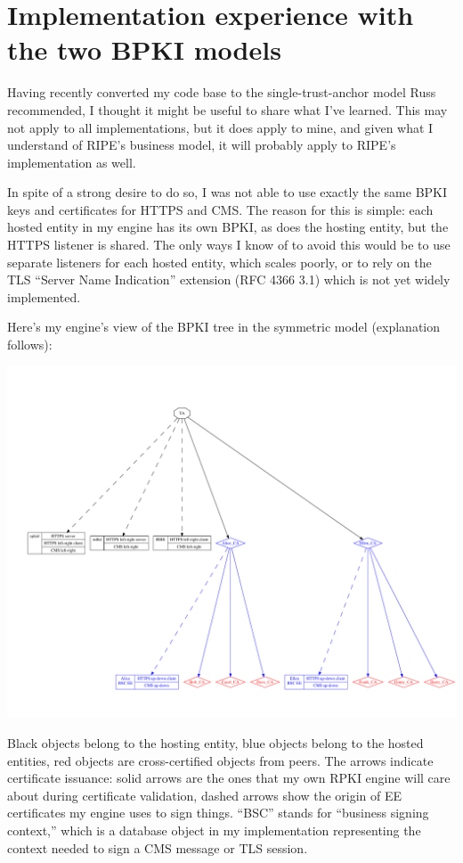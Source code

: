 \documentclass[11pt]{article}
\begin{document}
\section*{Implementation experience with the two BPKI models}

Having recently converted my code base to the single-trust-anchor
model Russ recommended, I thought it might be useful to share what
I've learned.  This may not apply to all implementations, but it does
apply to mine, and given what I understand of RIPE's business model,
it will probably apply to RIPE's implementation as well.

In spite of a strong desire to do so, I was not able to use exactly
the same BPKI keys and certificates for HTTPS and CMS.  The reason for
this is simple: each hosted entity in my engine has its own BPKI, as
does the hosting entity, but the HTTPS listener is shared.  The only
ways I know of to avoid this would be to use separate listeners for
each hosted entity, which scales poorly, or to rely on the TLS
``Server Name Indication'' extension (RFC 4366 3.1) which is not yet
widely implemented.

Here's my engine's view of the BPKI tree in the symmetric model
(explanation follows):

\begin{center}
\includegraphics[width = 6.5in]{bpki-symmetric}
\end{center}

Black objects belong to the hosting entity, blue objects belong to the
hosted entities, red objects are cross-certified objects from peers.
The arrows indicate certificate issuance: solid arrows are the ones
that my own RPKI engine will care about during certificate validation,
dashed arrows show the origin of EE certificates my engine uses to
sign things.  ``BSC'' stands for ``business signing context,'' which
is a database object in my implementation representing the context
needed to sign a CMS message or TLS session.
\end{document}
